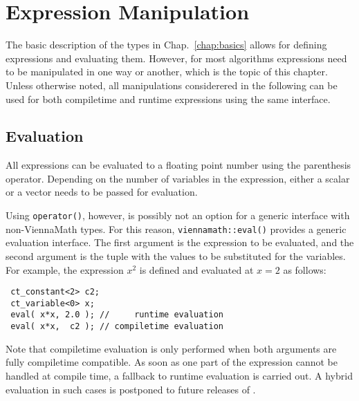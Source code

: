 \chapter{Expression Manipulation} \label{chap:manipulation}

The basic description of the types in Chap.~\ref{chap:basics} allows for defining expressions and evaluating them.
However, for most algorithms expressions need to be manipulated in one way or another, which is the topic of this chapter.
Unless otherwise noted, all manipulations considerered in the following can be used for both compiletime and runtime expressions using the same interface.


 \section{Evaluation}
All {\ViennaMath} expressions can be evaluated to a floating point number using the parenthesis operator.
Depending on the number of variables in the expression, either a scalar or a vector needs to be passed for evaluation.

Using \lstinline|operator()|, however, is possibly not an option for a generic interface with non-ViennaMath types.
For this reason, \lstinline|viennamath::eval()| provides a generic evaluation interface. 
The first argument is the expression to be evaluated, and the second argument is the tuple with the values to be substituted for the variables.
For example, the expression $x^2$ is defined and evaluated at $x=2$ as follows:
\begin{lstlisting}
 ct_constant<2> c2;
 ct_variable<0> x;
 eval( x*x, 2.0 ); //     runtime evaluation
 eval( x*x,  c2 ); // compiletime evaluation
\end{lstlisting}
Note that compiletime evaluation is only performed when both arguments are fully compiletime compatible.
As soon as one part of the expression cannot be handled at compile time, a fallback to runtime evaluation is carried out.
A hybrid evaluation in such cases is postponed to future releases of {\ViennaMath}.

